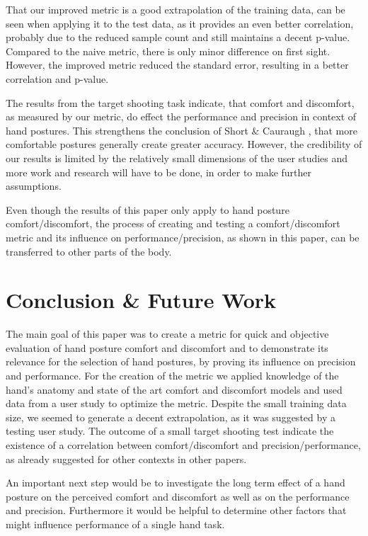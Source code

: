 \documentclass{sig-alternate-05-2015}
\begin{document}
That our improved metric is a good extrapolation of the training data, can be seen when applying it to the test data, as it provides an even better correlation, probably due to the reduced sample count and still maintains a decent p-value. Compared to the naive metric, there is only minor difference on first sight. However, the improved metric reduced the standard error, resulting in a better correlation and p-value.

The results from the target shooting task indicate, that comfort and discomfort, as measured by our metric, do effect the performance and precision in context of hand postures. This strengthens the conclusion of Short \& Cauraugh \cite{short1999precision}, that more comfortable postures generally create greater accuracy. However, the credibility of our results is limited by the relatively small dimensions of the user studies and more work and research will have to be done, in order to make further assumptions.

Even though the results of this paper only apply to hand posture comfort/discomfort, the process of creating and testing a comfort/discomfort metric and its influence on performance/precision, as shown in this paper, can be transferred to other parts of the body. 

\section{Conclusion \& Future Work}

The main goal of this paper was to create a metric for quick and objective evaluation of hand posture comfort and discomfort and to demonstrate its relevance for the selection of hand postures, by proving its influence on precision and performance. For the creation of the metric we applied knowledge of the hand's anatomy and state of the art comfort and discomfort models and used data from a user study to optimize the metric. Despite the small training data size, we seemed to generate a decent extrapolation, as it was suggested by a testing user study. The outcome of a small target shooting test indicate the existence of a correlation between comfort/discomfort and precision/performance, as already suggested for other contexts in other papers.

An important next step would be to investigate the long term effect of a hand posture on the perceived comfort and discomfort as well as on the performance and precision. Furthermore it would be helpful to determine other factors that might influence performance of a single hand task. 

%

%
%

\end{document}
